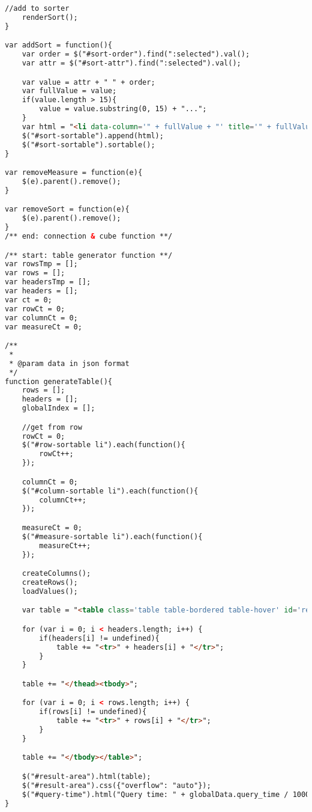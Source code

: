 \begin{lstlisting}[language=HTML,basicstyle=\tiny,caption=script.js]
    //add to sorter
    renderSort();
}

var addSort = function(){
    var order = $("#sort-order").find(":selected").val();
    var attr = $("#sort-attr").find(":selected").val();

    var value = attr + " " + order;
    var fullValue = value;
    if(value.length > 15){
        value = value.substring(0, 15) + "...";
    }
    var html = "<li data-column='" + fullValue + "' title='" + fullValue + "'>" + value + " <a href='#' class='text text-danger' onclick='removeSort(this)'><span class='glyphicon glyphicon-remove'></span></a></li>";
    $("#sort-sortable").append(html);
    $("#sort-sortable").sortable();
}

var removeMeasure = function(e){
    $(e).parent().remove();
}

var removeSort = function(e){
    $(e).parent().remove();
}
/** end: connection & cube function **/

/** start: table generator function **/
var rowsTmp = [];
var rows = [];
var headersTmp = [];
var headers = [];
var ct = 0;
var rowCt = 0;
var columnCt = 0;
var measureCt = 0;

/**
 *
 * @param data in json format
 */
function generateTable(){
    rows = [];
    headers = [];
    globalIndex = [];

    //get from row
    rowCt = 0;
    $("#row-sortable li").each(function(){
        rowCt++;
    });

    columnCt = 0;
    $("#column-sortable li").each(function(){
        columnCt++;
    });

    measureCt = 0;
    $("#measure-sortable li").each(function(){
        measureCt++;
    });

    createColumns();
    createRows();
    loadValues();

    var table = "<table class='table table-bordered table-hover' id='result-table'><thead>";

    for (var i = 0; i < headers.length; i++) {
        if(headers[i] != undefined){
            table += "<tr>" + headers[i] + "</tr>";
        }
    }

    table += "</thead><tbody>";

    for (var i = 0; i < rows.length; i++) {
        if(rows[i] != undefined){
            table += "<tr>" + rows[i] + "</tr>";
        }
    }

    table += "</tbody></table>";

    $("#result-area").html(table);
    $("#result-area").css({"overflow": "auto"});
    $("#query-time").html("Query time: " + globalData.query_time / 1000 + " s");
}


\end{lstlisting}
